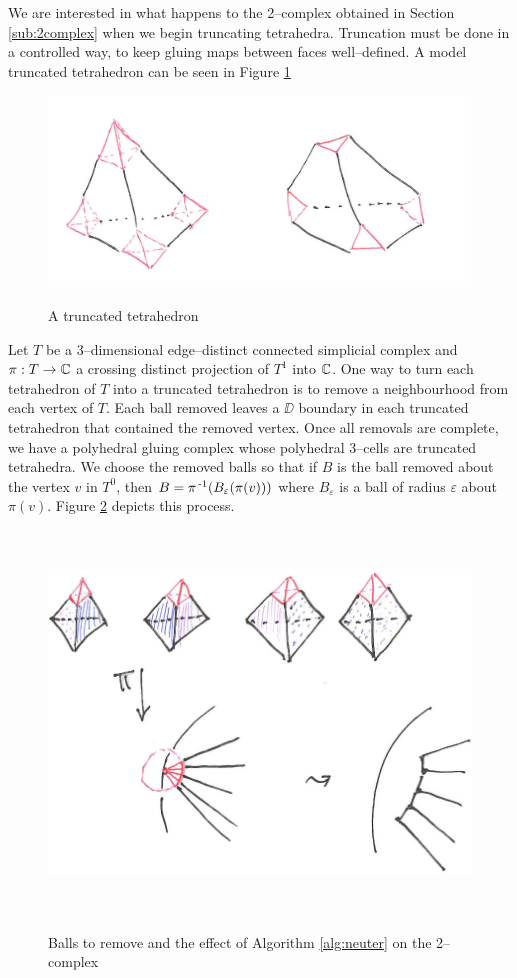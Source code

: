 We are interested in what happens to the 2--complex obtained in Section \ref{sub:2complex} when we begin truncating tetrahedra.
Truncation must be done in a controlled way, to keep gluing maps between faces well--defined.
A model truncated tetrahedron can be seen in Figure \ref{fig:truncttet}

\begin{figure}
	\centering
	\captionsetup{justification=centering}
	\caption{A truncated tetrahedron}
	\includegraphics[height=2in]{figures/truncttet.jpg}
	\label{fig:truncttet}
\end{figure}

Let $T$ be a 3--dimensional edge--distinct connected simplicial complex and $\pi:T\to\mathbb{C}$ a crossing distinct projection of $T^1$ into $\mathbb{C}$.
One way to turn each tetrahedron of $T$ into a truncated tetrahedron is to remove a neighbourhood from each vertex of $T$.
Each ball removed leaves a $\DD$ boundary in each truncated tetrahedron that contained the removed vertex.
Once all removals are complete, we have a polyhedral gluing complex whose polyhedral 3--cells are truncated tetrahedra.
We choose the removed balls so that if $B$ is the ball removed about the vertex $v$ in $T^0$, then $B = \pi^{\,\text{-}1}(B_\varepsilon(\pi(v)))$ where $B_\varepsilon$ is a ball of radius $\varepsilon$ about $\pi(v)$.
Figure \ref{fig:neuter} depicts this process.

\begin{figure}
	\centering
	\captionsetup{justification=centering}
	\caption{Balls to remove and the effect of Algorithm \ref{alg:neuter} on the 2--complex}
	\includegraphics[height=4in]{figures/neuter.jpg}
	\label{fig:neuter}
\end{figure}

